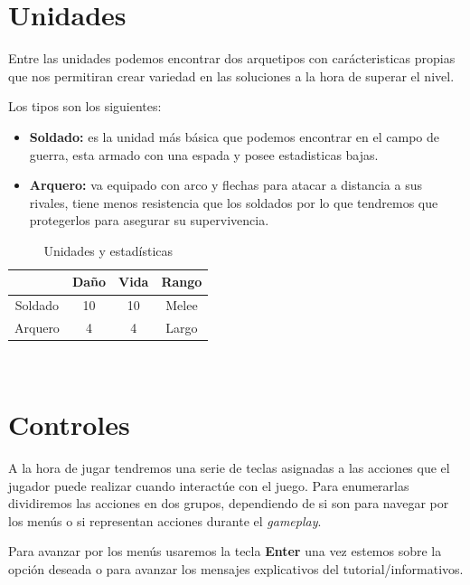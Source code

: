 \section{Unidades}
Entre las unidades podemos encontrar dos arquetipos con carácteristicas propias
que nos permitiran crear variedad en las soluciones a la hora de superar el
nivel.

Los tipos son los siguientes:
\begin{itemize}
	\item \textbf{Soldado:} es la unidad más básica que podemos encontrar en el campo de
							guerra, esta armado con una espada y posee estadisticas
							bajas.
	\item \textbf{Arquero:} va equipado con arco y flechas para atacar a distancia a
							sus rivales, tiene menos resistencia que los soldados por
							lo que tendremos que protegerlos para asegurar su
							supervivencia.
\end{itemize}

\begin{table}[ht]
\begin{center}
\begin{tabular}{|c|c|c|c|}
\hline
        & Daño & Vida & Rango \\ 
\hline
\hline
Soldado & 10    & 10    & Melee \\ 
\hline
Arquero & 4     & 4     & Largo \\ 
\hline
\end{tabular}\\
\caption{Unidades y estadísticas}
\end{center}
\end{table}

\section{Controles}
A la hora de jugar tendremos una serie de teclas asignadas a las acciones que el
jugador puede realizar cuando interactúe con el juego. Para enumerarlas dividiremos las
acciones en dos grupos, dependiendo de si son para navegar por los menús o si
representan acciones durante el \textit{gameplay}.

Para avanzar por los menús usaremos la tecla \textbf{Enter} una vez estemos sobre la opción deseada o
para avanzar los mensajes explicativos del tutorial/informativos.

